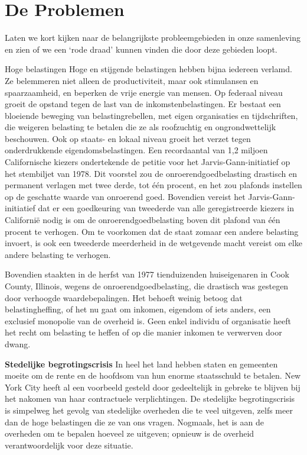 \documentclass[
  a5paper,
  smalldemyvopaper,10pt,twoside,onecolumn,openright,extrafontsizes,hidelinks]{memoir}
\begin{document}

\chapter{De Problemen}\label{de-problemen}

Laten we kort kijken naar de belangrijkste probleemgebieden in onze
samenleving en zien of we een `rode draad' kunnen vinden die door deze
gebieden loopt.

Hoge belastingen Hoge en stijgende belastingen hebben bijna iedereen
verlamd. Ze belemmeren niet alleen de productiviteit, maar ook
stimulansen en spaarzaamheid, en beperken de vrije energie van mensen.
Op federaal niveau groeit de opstand tegen de last van de
inkomstenbelastingen. Er bestaat een bloeiende beweging van
belastingrebellen, met eigen organisaties en tijdschriften, die weigeren
belasting te betalen die ze als roofzuchtig en ongrondwettelijk
beschouwen. Ook op staats- en lokaal niveau groeit het verzet tegen
onderdrukkende eigendomsbelastingen. Een recordaantal van 1,2 miljoen
Californische kiezers ondertekende de petitie voor het
Jarvis-Gann-initiatief op het stembiljet van 1978. Dit voorstel zou de
onroerendgoedbelasting drastisch en permanent verlagen met twee derde,
tot één procent, en het zou plafonds instellen op de geschatte waarde
van onroerend goed. Bovendien vereist het Jarvis-Gann-initiatief dat er
een goedkeuring van tweederde van alle geregistreerde kiezers in
Californië nodig is om de onroerendgoedbelasting boven dit plafond van
één procent te verhogen. Om te voorkomen dat de staat zomaar een andere
belasting invoert, is ook een tweederde meerderheid in de wetgevende
macht vereist om elke andere belasting te verhogen.

Bovendien staakten in de herfst van 1977 tienduizenden huiseigenaren in
Cook County, Illinois, wegens de onroerendgoedbelasting, die drastisch
was gestegen door verhoogde waardebepalingen. Het behoeft weinig betoog
dat belastingheffing, of het nu gaat om inkomen, eigendom of iets
anders, een exclusief monopolie van de overheid is. Geen enkel individu
of organisatie heeft het recht om belasting te heffen of op die manier
inkomen te verwerven door dwang.

\textbf{Stedelijke begrotingscrisis} In heel het land hebben staten en
gemeenten moeite om de rente en de hoofdsom van hun enorme staatsschuld
te betalen. New York City heeft al een voorbeeld gesteld door
gedeeltelijk in gebreke te blijven bij het nakomen van haar contractuele
verplichtingen. De stedelijke begrotingscrisis is simpelweg het gevolg
van stedelijke overheden die te veel uitgeven, zelfs meer dan de hoge
belastingen die ze van ons vragen. Nogmaals, het is aan de overheden om
te bepalen hoeveel ze uitgeven; opnieuw is de overheid verantwoordelijk
voor deze situatie.
\end{document}
